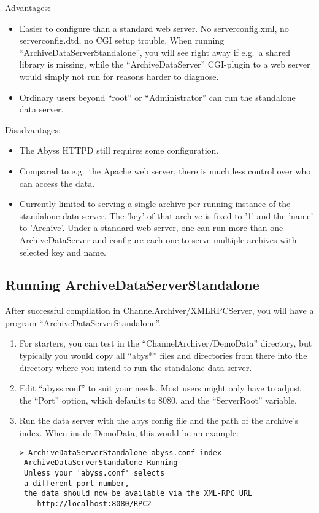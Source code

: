 \noindent Advantages:
\begin{itemize}
\item Easier to configure than a standard web server. No
  serverconfig.xml, no serverconfig.dtd, no CGI setup trouble. When running
  ``ArchiveDataServerStandalone'', you will see right away if e.g.\ a
  shared library is missing, while the ``ArchiveDataServer''
  CGI-plugin to a web server would simply not run for reasons harder
  to diagnose.
\item Ordinary users beyond ``root'' or ``Administrator''
  can run the standalone data server.
\end{itemize}

\noindent Disadvantages:
\begin{itemize}
\item The Abyss HTTPD still requires some configuration.
\item Compared to e.g.\ the Apache web server, there is much less
  control over who can access the data.
\item Currently limited to serving a single archive per running
  instance of the standalone data server.
  The 'key' of that archive is fixed to '1' and  the 'name' to 'Archive'.
  Under a standard web server, one can run more than one
  ArchiveDataServer and configure each one to serve multiple archives
  with selected key and name.
\end{itemize}

\subsection{Running ArchiveDataServerStandalone} %
After successful compilation in ChannelArchiver/XMLRPCServer, you will
have a program ``ArchiveDataServerStandalone''.

\begin{enumerate}
\item For starters, you can test in the ``ChannelArchiver/DemoData''
      directory, but typically you would copy all ``abys*'' files and
      directories from there into the directory where you intend to
      run the standalone data server.
\item Edit ``abyss.conf'' to suit your needs. Most users might only
      have to adjust the ``Port'' option, which defaults to 8080,
      and the ``ServerRoot'' variable.
\item Run the data server with the abys config file and the path of
      the archive's index. When inside DemoData, this would be an example:
\begin{lstlisting}[keywordstyle=\sffamily]
> ArchiveDataServerStandalone abyss.conf index 
 ArchiveDataServerStandalone Running
 Unless your 'abyss.conf' selects
 a different port number,
 the data should now be available via the XML-RPC URL
    http://localhost:8080/RPC2
\end{lstlisting}
\end{enumerate}

